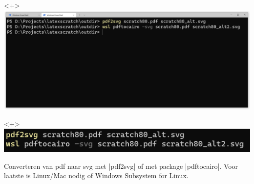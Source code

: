 \begin{frame}
    \begin{onlyenv}<+>
        \includegraphics[width=\textwidth,height=0.8\textheight,keepaspectratio]{assets/convert_pdf_to_svg.png}
    \end{onlyenv}
    \begin{onlyenv}<+>
        \unless\ifishandout
        \includegraphics[width=\textwidth,height=0.8\textheight,keepaspectratio]{assets/convert_pdf_to_svg-small.png}
        \fi
    \end{onlyenv}

    Converteren van pdf naar svg met \hll|pdf2svg| of met package \hll|pdftocairo|. Voor laatste
    is Linux/Mac nodig of Windows Subsystem for Linux.
\end{frame}

